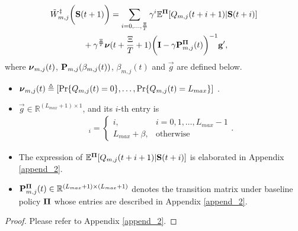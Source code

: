 \begin{lemma}
    \label{lemma:w_es}
    {\small
    \begin{align}
        &\tilde{W}^{\ddagger}_{m,j}\bigg(\mathbf{S}(t+1)\bigg)
    = \sum_{i=0,\dots,\frac{\Xi}{T}} \gamma^{i} \mathbb{E}^{\boldsymbol{\Pi}}[ Q_{m,j}({t+i+1}) | \mathbf{S}(t+i)]
    \nonumber\\
    &~~~~~~~~~~~~+ \gamma^{\frac{\Xi}{T}} 
    \boldsymbol{\nu}({t+\frac{\Xi}{T}+1})
    \bigg(
        \mathbf{I} - \gamma \mathbf{P}^{\boldsymbol{\Pi}}_{m,j}(t)
    \bigg)^{-1} \mathbf{g}',
        \label{w_es}
    \end{align}   
    }
    where $\boldsymbol{\nu}_{m,j}(t)$, $\mathbf{P}_{m,j}(\beta_{m,j}(t))$, $\beta_{m,j}(t)$ and $\vec{g}$ are defined below.
    \begin{itemize}
        \item {\small
        $\boldsymbol{\nu}_{m,j}(t) \triangleq [\Pr\{Q_{m,j}(t)=0\}, \dots, \Pr\{Q_{m,j}(t)=L_{max}\}]$
        }.
        \item $\vec{g} \in \mathbb{R}^{(L_{max}+1) \times 1}$, and its $i$-th entry is
        \begin{align}
            [\vec{g}]_{i} = 
            \begin{cases}
                i, & i=0,1,\dots,L_{max}-1
                \\
                L_{max}+\beta, & \text{otherwise}
            \end{cases}.
            \label{eqn:g_vec}
        \end{align}
        \item The expression of $\mathbb{E}^{\boldsymbol{\Pi}}[ Q_{m,j}({t+i+1}) | \mathbf{S}(t+i)]$ is elaborated in Appendix \ref{append_2}.
        \item $\mathbf{P}^{\boldsymbol{\Pi}}_{m,j}(t) \in \mathbb{R}^{(L_{max}+1) \times (L_{max}+1)}$ denotes the transition matrix under baseline policy $\boldsymbol{\Pi}$ whose entries are described in Appendix \ref{append_2}.
    \end{itemize}   
\end{lemma}
\begin{proof}
    Please refer to Appendix \ref{append_2}.
\end{proof}

